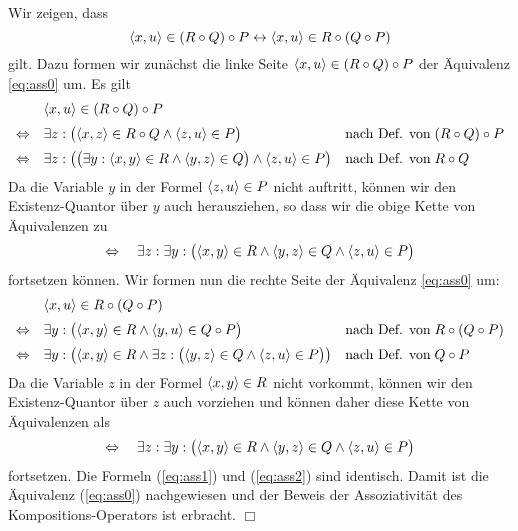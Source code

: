 \proof
Wir zeigen, dass
\begin{equation}
  \label{eq:ass0}
   \pair(x,u) \in (R \circ Q) \circ P \leftrightarrow \pair(x,u) \in R \circ (Q \circ P)   
\end{equation}
gilt.  Dazu formen wir zun\"{a}chst die linke Seite $\pair(x,u) \in (R \circ Q) \circ P$ der \"{A}quivalenz
\ref{eq:ass0} um.  Es gilt
\[
\begin{array}{cll}
                  & \pair(x,u) \in (R \circ Q) \circ P \\[0.2cm]
  \Leftrightarrow & \exists z: \bigl(\pair(x,z) \in R \circ Q \wedge \pair(z,u) \in P\bigr) &
                    \mbox{nach Def. von}\; (R \circ Q) \circ P \\[0.2cm]
  \Leftrightarrow & \exists z: \bigl(\bigl(\exists y: \pair(x,y) \in R \wedge \pair(y,z) \in Q\bigr) \wedge \pair(z,u) \in P\bigr) &
                    \mbox{nach Def. von}\; R \circ Q \\
\end{array}
\]
Da die Variable $y$ in der Formel $\pair(z,u) \in P$ nicht auftritt, k\"{o}nnen wir den
Existenz-Quantor \"{u}ber $y$ auch herausziehen, so dass wir die obige Kette von \"{A}quivalenzen zu
\begin{equation}
  \label{eq:ass1}
  \Leftrightarrow \quad 
  \exists z: \exists y: \bigl(\pair(x,y) \in R \wedge \pair(y,z) \in Q \wedge \pair(z,u) \in P\bigr)
\end{equation}
fortsetzen k\"{o}nnen.  Wir formen nun die rechte Seite der \"{A}quivalenz
\ref{eq:ass0} um:
\[
\begin{array}{cll}
                & \pair(x,u) \in R \circ (Q \circ P) \\[0.2cm] 
\Leftrightarrow & \exists y: \bigl(\pair(x,y) \in R \wedge \pair (y,u) \in Q \circ P\bigr) &
                  \mbox{nach Def. von}\; R \circ (Q \circ P) \\[0.2cm]
\Leftrightarrow & \exists y: \bigl(\pair(x,y) \in R \wedge 
                  \exists z: \bigl(\pair(y,z) \in Q \wedge \pair(z,u) \in P\bigr)\bigr) &
                  \mbox{nach Def. von}\; Q \circ P \\
\end{array}
\]
Da die Variable $z$ in der Formel $\pair(x,y) \in R$ nicht vorkommt, k\"{o}nnen wir den
Existenz-Quantor \"{u}ber $z$ auch vorziehen und k\"{o}nnen daher diese Kette von \"{A}quivalenzen als
\begin{equation}
  \label{eq:ass2}
  \Leftrightarrow \quad
  \exists z: \exists y: \bigl(\pair(x,y) \in R \wedge \pair(y,z) \in Q \wedge \pair(z,u) \in P\bigr)
\end{equation}
fortsetzen. Die Formeln (\ref{eq:ass1}) und (\ref{eq:ass2}) sind identisch.  Damit ist die \"{A}quivalenz
(\ref{eq:ass0}) nachgewiesen und der Beweis der Assoziativit\"{a}t des Kompositions-Operators
ist erbracht.  \hspace*{\fill} $\Box$
\vspace{0.2cm}

